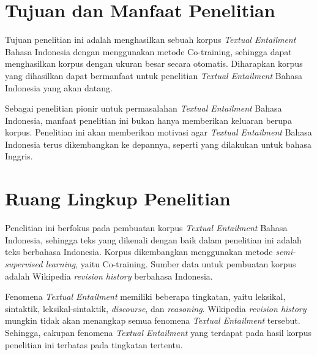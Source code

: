\section{Tujuan dan Manfaat Penelitian}
Tujuan penelitian ini adalah menghasilkan sebuah korpus \textit{Textual Entailment} Bahasa Indonesia dengan menggunakan metode Co-training, sehingga dapat menghasilkan korpus dengan ukuran besar secara otomatis. Diharapkan korpus yang dihasilkan dapat bermanfaat untuk penelitian \textit{Textual Entailment} Bahasa Indonesia yang akan datang.

Sebagai penelitian pionir untuk permasalahan \textit{Textual Entailment} Bahasa Indonesia, manfaat penelitian ini bukan hanya memberikan keluaran berupa korpus. Penelitian ini akan memberikan motivasi agar \textit{Textual Entailment} Bahasa Indonesia terus dikembangkan ke depannya, seperti yang dilakukan untuk bahasa Inggris.

\section{Ruang Lingkup Penelitian}
Penelitian ini berfokus pada pembuatan korpus \textit{Textual Entailment} Bahasa Indonesia, sehingga teks yang dikenali dengan baik dalam penelitian ini adalah teks berbahasa Indonesia. Korpus dikembangkan menggunakan metode \textit{semi-supervised learning}, yaitu Co-training. Sumber data untuk pembuatan korpus adalah Wikipedia \textit{revision history} berbahasa Indonesia.

Fenomena \textit{Textual Entailment} memiliki beberapa tingkatan, yaitu leksikal, sintaktik, leksikal-sintaktik, \textit{discourse}, dan \textit{reasoning}. Wikipedia \textit{revision history} mungkin tidak akan menangkap semua fenomena \textit{Textual Entailment} tersebut. Sehingga, cakupan fenomena \textit{Textual Entailment} yang terdapat pada hasil korpus penelitian ini terbatas pada tingkatan tertentu.

